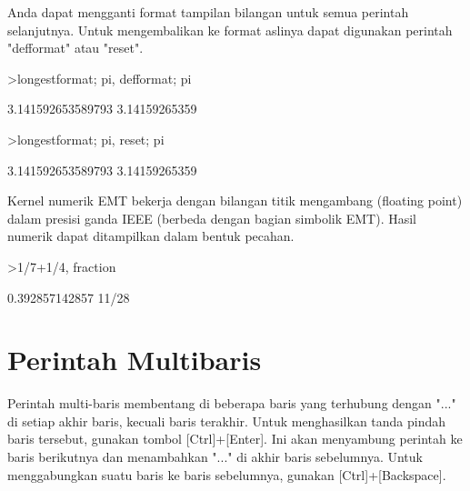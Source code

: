 \documentclass{article}
\newenvironment{eulernotebook}{\par}{\par}
\newcommand{\eulerheading}[1]{\section{#1}}
\newenvironment{eulercomment}{\par\medskip}{\par\medskip}
\begin{document}
\begin{eulernotebook}
\begin{eulercomment}
Anda dapat mengganti format tampilan bilangan untuk semua perintah
selanjutnya. Untuk mengembalikan ke format aslinya dapat digunakan
perintah "defformat" atau "reset".
\end{eulercomment}
\begin{eulerprompt}
>longestformat; pi, defformat; pi
\end{eulerprompt}
\begin{euleroutput}
  3.141592653589793
  3.14159265359
\end{euleroutput}
\begin{eulerprompt}
>longestformat; pi, reset; pi
\end{eulerprompt}
\begin{euleroutput}
  3.141592653589793
  3.14159265359
\end{euleroutput}
\begin{eulercomment}
Kernel numerik EMT bekerja dengan bilangan titik mengambang (floating point)
dalam presisi ganda IEEE (berbeda dengan bagian simbolik EMT). Hasil numerik
dapat ditampilkan dalam bentuk pecahan.
\end{eulercomment}
\begin{eulerprompt}
>1/7+1/4, fraction %
\end{eulerprompt}
\begin{euleroutput}
  0.392857142857
  11/28
\end{euleroutput}
\eulerheading{Perintah Multibaris}
\begin{eulercomment}
Perintah multi-baris membentang di beberapa baris yang terhubung
dengan "..." di setiap akhir baris, kecuali baris terakhir. Untuk
menghasilkan tanda pindah baris tersebut, gunakan tombol
[Ctrl]+[Enter]. Ini akan menyambung perintah ke baris berikutnya dan
menambahkan "..." di akhir baris sebelumnya. Untuk menggabungkan suatu
baris ke baris sebelumnya, gunakan [Ctrl]+[Backspace].


\end{eulercomment}
\end{eulernotebook}
\end{document}
